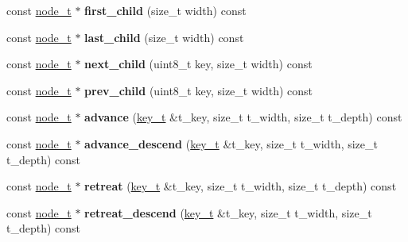 \begin{DoxyCompactItemize}
const \hyperlink{structdialog_1_1index_1_1radix__tree__node}{node\+\_\+t} $\ast$ {\bfseries first\+\_\+child} (size\+\_\+t width) const
\item 
\mbox{\label{structdialog_1_1index_1_1radix__tree__node_a35eb69ba2cb5a5300de64331619f3c5d}} 
const \hyperlink{structdialog_1_1index_1_1radix__tree__node}{node\+\_\+t} $\ast$ {\bfseries last\+\_\+child} (size\+\_\+t width) const
\item 
\mbox{\label{structdialog_1_1index_1_1radix__tree__node_a59c5bae980c11d89d714630d440fd964}} 
const \hyperlink{structdialog_1_1index_1_1radix__tree__node}{node\+\_\+t} $\ast$ {\bfseries next\+\_\+child} (uint8\+\_\+t key, size\+\_\+t width) const
\item 
\mbox{\label{structdialog_1_1index_1_1radix__tree__node_ae28a3dff60ac574327ef8812b26e9173}} 
const \hyperlink{structdialog_1_1index_1_1radix__tree__node}{node\+\_\+t} $\ast$ {\bfseries prev\+\_\+child} (uint8\+\_\+t key, size\+\_\+t width) const
\item 
\mbox{\label{structdialog_1_1index_1_1radix__tree__node_a4f3f487295eacd60061d710104ade025}} 
const \hyperlink{structdialog_1_1index_1_1radix__tree__node}{node\+\_\+t} $\ast$ {\bfseries advance} (\hyperlink{classdialog_1_1byte__string}{key\+\_\+t} \&t\+\_\+key, size\+\_\+t t\+\_\+width, size\+\_\+t t\+\_\+depth) const
\item 
\mbox{\label{structdialog_1_1index_1_1radix__tree__node_aa781f4973238e053bfd131c28e8ff8e2}} 
const \hyperlink{structdialog_1_1index_1_1radix__tree__node}{node\+\_\+t} $\ast$ {\bfseries advance\+\_\+descend} (\hyperlink{classdialog_1_1byte__string}{key\+\_\+t} \&t\+\_\+key, size\+\_\+t t\+\_\+width, size\+\_\+t t\+\_\+depth) const
\item 
\mbox{\label{structdialog_1_1index_1_1radix__tree__node_a74ab89b8f9791631b5457aba7d9a37d4}} 
const \hyperlink{structdialog_1_1index_1_1radix__tree__node}{node\+\_\+t} $\ast$ {\bfseries retreat} (\hyperlink{classdialog_1_1byte__string}{key\+\_\+t} \&t\+\_\+key, size\+\_\+t t\+\_\+width, size\+\_\+t t\+\_\+depth) const
\item 
\mbox{\label{structdialog_1_1index_1_1radix__tree__node_a18804efbeade1df1028f2ccdada36a27}} 
const \hyperlink{structdialog_1_1index_1_1radix__tree__node}{node\+\_\+t} $\ast$ {\bfseries retreat\+\_\+descend} (\hyperlink{classdialog_1_1byte__string}{key\+\_\+t} \&t\+\_\+key, size\+\_\+t t\+\_\+width, size\+\_\+t t\+\_\+depth) const
\end{DoxyCompactItemize}
